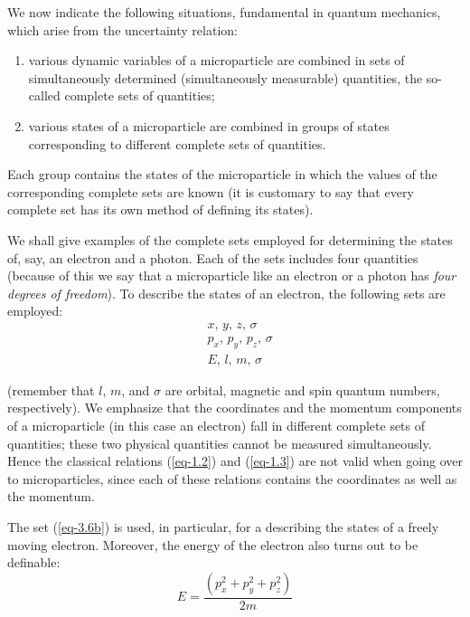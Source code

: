 \documentclass[a4paper,sfsidenotes,colorlinks=true]{tufte-book}
\numberwithin{equation}{section}
\numberwithin{figure}{section}
\begin{document}
  We now indicate the following situations, fundamental in quantum
  mechanics, which arise from the uncertainty relation: 
  \begin{enumerate}[label=(\alph*),leftmargin=1cm]
  \item various dynamic variables of a microparticle are combined in
    sets of simultaneously determined (simultaneously measurable)
    quantities, the so-called complete sets of quantities;
  \item various states of a microparticle are combined in groups of
    states corresponding to different complete sets of
    quantities.
\end{enumerate}
Each group contains the states of the microparticle in which the
values of the corresponding complete sets are known (it is customary
to say that every complete set has its own method of defining its
states).

We shall give examples of the complete sets employed for determining
the states of, say, an electron and a photon. Each of the sets
includes four quantities (because of this we say that a microparticle
like an electron or a photon has \emph{four degrees of freedom}). To
describe the states of an electron, the following sets are employed:
\begin{align}%
& x, \, y,  \, z,  \, \sigma \tag{3.6a} \label{eq-3.6a}\\
& p_{x}, \, p_{y}, \, p_{z},  \, \sigma \tag{3.6b} \label{eq-3.6b}\\
& E, \, l, \, m, \, \sigma \tag{3.6c} \label{eq-3.6c}
\end{align}

(remember that $l$, $m$, and $\sigma$ are orbital, magnetic and spin
quantum numbers, respectively). We emphasize that the coordinates and
the momentum components of a microparticle (in this case an electron)
fall in different complete sets of quantities; these two physical
quantities cannot be measured simultaneously. Hence the classical
relations (\ref{eq-1.2}) and (\ref{eq-1.3}) are not valid when going over to
microparticles, since each of these relations contains the coordinates
as well as the momentum.

The set (\ref{eq-3.6b}) is used, in particular, for a describing the states of
a freely moving electron. Moreover, the energy of the electron also
turns out to be definable: 
\begin{equation*}
  E = \frac{( p_{x}^{2}+ p_{y}^{2} + p_{z}^{2})}{2m}
\end{equation*}
\end{document}

